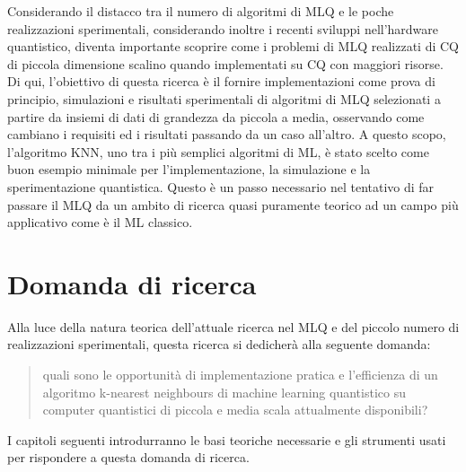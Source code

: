 Considerando il distacco tra il numero di algoritmi di \ac{MLQ} e le poche realizzazioni 
sperimentali, considerando inoltre i recenti sviluppi nell'hardware quantistico, diventa 
importante scoprire come i problemi di \ac{MLQ} realizzati di \ac{CQ} di piccola dimensione 
scalino quando implementati su \ac{CQ} con maggiori risorse. 
Di qui, l'obiettivo di questa ricerca è il fornire implementazioni come prova di principio, 
simulazioni e risultati sperimentali di algoritmi di \ac{MLQ} selezionati a partire da 
insiemi di dati di grandezza da piccola a media, osservando come cambiano i requisiti ed 
i risultati passando da un caso all'altro. A questo scopo, l'algoritmo \acf{KNN}, uno tra i 
più semplici algoritmi di \ac{ML}, è stato scelto come buon esempio minimale per 
l'implementazione, la simulazione e la sperimentazione quantistica. 
Questo è un passo necessario nel tentativo di far passare il \ac{MLQ} da un ambito di 
ricerca quasi puramente teorico ad un campo più applicativo come è il \ac{ML} classico. 

\section{Domanda di ricerca}

Alla luce della natura teorica dell'attuale ricerca nel \ac{MLQ} 
e del piccolo numero di realizzazioni sperimentali, questa ricerca si dedicherà 
alla seguente domanda: 
\begin{quote}
    quali sono le opportunità di implementazione pratica e l'efficienza di un algoritmo 
    k-nearest neighbours di machine learning quantistico su computer quantistici di piccola 
    e media scala attualmente disponibili?
\end{quote}
I capitoli seguenti introdurranno le basi teoriche necessarie e gli strumenti usati 
per rispondere a questa domanda di ricerca. 

